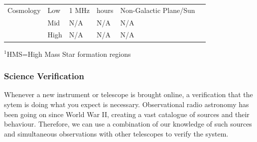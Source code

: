 \begin{table}
\begin{tabular}{|l|llll|l|}
\hline
Cosmology             & Low                    & 1 MHz              & hours                &  Non-Galactic Plane/Sun  &                                                                                                       \\
                      & Mid                    & N/A              & N/A           & N/A &                                                                                                       \\
                      & High                   & N/A              & N/A            &         N/A &                                                                            \\
\hline
\end{tabular}
$^{1}$HMS=High Mass Star formation regions
\end{table}


\subsubsection{Science Verification}

Whenever a new instrument or telescope is brought online, a verification that the sytem is doing what you expect is necessary. Observational radio astronomy has been going on since World War II, creating a vast catalogue of sources and their behaviour. Therefore, we can use a combination of our knowledge of such sources and simultaneous observations with other telescopes to verify the system. 


